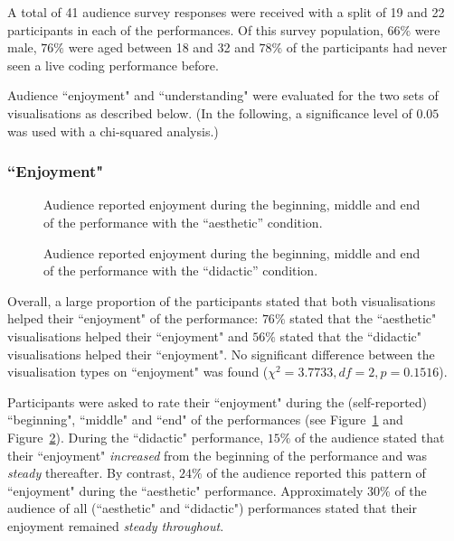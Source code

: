 \documentclass{sig-alternate}
\begin{document}
A total of 41 audience survey responses were received with a split of 19 and 22 participants in each of the performances. Of this survey population, $66\%$ were male, $76\%$ were aged between 18 and 32 and $78\%$ of the participants had never seen a live coding performance before.

Audience ``enjoyment" and ``understanding" were evaluated for the two sets of visualisations as described below. (In the following, a significance level of $0.05$ was used with a chi-squared analysis.)

\subsubsection{``Enjoyment"}

\begin{figure}
\centering
{}
\caption{Audience reported enjoyment during the beginning, middle and end of the performance with the ``aesthetic'' condition.}
\label{fig:aesthetic-enjoyment}
\end{figure}

\begin{figure}
\centering
{}
\caption{Audience reported enjoyment during the beginning, middle and end of the performance with the ``didactic'' condition.}
\label{fig:didactic-enjoyment}
\end{figure}

Overall, a large proportion of the participants stated that both visualisations helped their ``enjoyment" of the performance: $76\%$ stated that the ``aesthetic" visualisations helped their ``enjoyment" and $56\%$ stated that the ``didactic" visualisations helped their ``enjoyment". No significant difference between the visualisation types on ``enjoyment" was found ($\chi^2=3.7733,df=2,p=0.1516$).

Participants were asked to rate their ``enjoyment" during the (self-reported) ``beginning", ``middle" and ``end" of the performances (see Figure~\ref{fig:aesthetic-enjoyment} and Figure~\ref{fig:didactic-enjoyment}). During the ``didactic" performance, $15\%$ of the audience stated that their ``enjoyment" {\it increased} from the beginning of the performance and was {\it steady} thereafter. By contrast, $24\%$ of the audience reported this pattern of ``enjoyment" during the ``aesthetic" performance. Approximately $30\%$ of the audience of all (``aesthetic" and ``didactic") performances stated that their enjoyment remained {\it steady throughout}.
\end{document}
